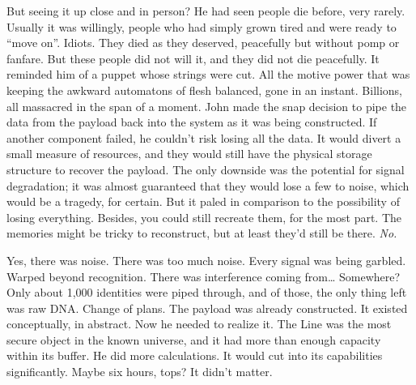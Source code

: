 But seeing it up close and in person? He had seen people die before, very rarely. Usually it was willingly, people who had simply grown tired and were ready to “move on”. Idiots. They died as they deserved, peacefully but without pomp or fanfare. But these people did not will it, and they did not die peacefully. It reminded him of a puppet whose strings were cut. All the motive power that was keeping the awkward automatons of flesh balanced, gone in an instant. Billions, all massacred in the span of a moment.
\SmallVSpace
John made the snap decision to pipe the data from the payload back into the system as it was being constructed. If another component failed, he couldn’t risk losing all the data. It would divert a small measure of resources, and they would still have the physical storage structure to recover the payload.  The only downside was the potential for signal degradation; it was almost guaranteed that they would lose a few to noise, which would be a tragedy, for certain. But it paled in comparison to the possibility of losing everything. Besides, you could still recreate them, for the most part. The memories might be tricky to reconstruct, but at least they’d still be there.
\SmallVSpace
\emph{No.}\par
\SmallVSpace
Yes, there was noise. There was too much noise. Every signal was being garbled. Warped beyond recognition. There was interference coming from… Somewhere? Only about 1,000 identities were piped through, and of those, the only thing left was raw DNA.  Change of plans.
\SomeVSpace
The payload was already constructed. It existed conceptually, in abstract. Now he needed to realize it. The Line was the most secure object in the known universe, and it had more than enough capacity within its buffer. He did more calculations. It would cut into its capabilities significantly. Maybe six hours, tops? It didn’t matter.


